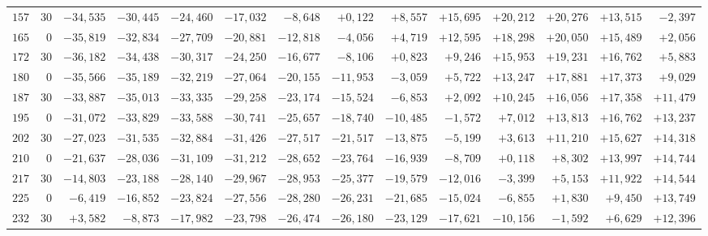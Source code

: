 \begin{landscape}
\begin{longtable}{@{}rr|r|r|r|r|r|r|r|r|r|r|r|r@{}}
\(157\) & \(30\) & \(-34{,}535\) & \(-30{,}445\) & \(-24{,}460\) & \(-17{,}032\) & \(-8{,}648\) & \(+0{,}122\) & \(+8{,}557\) & \(+15{,}695\) & \(+20{,}212\) & \(+20{,}276\) & \(+13{,}515\) & \(-2{,}397\)\\
\(165\) & \(0\) & \(-35{,}819\) & \(-32{,}834\) & \(-27{,}709\) & \(-20{,}881\) & \(-12{,}818\) & \(-4{,}056\) & \(+4{,}719\) & \(+12{,}595\) & \(+18{,}298\) & \(+20{,}050\) & \(+15{,}489\) & \(+2{,}056\)\\
\(172\) & \(30\) & \(-36{,}182\) & \(-34{,}438\) & \(-30{,}317\) & \(-24{,}250\) & \(-16{,}677\) & \(-8{,}106\) & \(+0{,}823\) & \(+9{,}246\) & \(+15{,}953\) & \(+19{,}231\) & \(+16{,}762\) & \(+5{,}883\)\\[2pt]
\(180\) & \(0\) & \(-35{,}566\) & \(-35{,}189\) & \(-32{,}219\) & \(-27{,}064\) & \(-20{,}155\) & \(-11{,}953\) & \(-3{,}059\) & \(+5{,}722\) & \(+13{,}247\) & \(+17{,}881\) & \(+17{,}373\) & \(+9{,}029\)\\
\(187\) & \(30\) & \(-33{,}887\) & \(-35{,}013\) & \(-33{,}335\) & \(-29{,}258\) & \(-23{,}174\) & \(-15{,}524\) & \(-6{,}853\) & \(+2{,}092\) & \(+10{,}245\) & \(+16{,}056\) & \(+17{,}358\) & \(+11{,}479\)\\
\(195\) & \(0\) & \(-31{,}072\) & \(-33{,}829\) & \(-33{,}588\) & \(-30{,}741\) & \(-25{,}657\) & \(-18{,}740\) & \(-10{,}485\) & \(-1{,}572\) & \(+7{,}012\) & \(+13{,}813\) & \(+16{,}762\) & \(+13{,}237\)\\
\(202\) & \(30\) & \(-27{,}023\) & \(-31{,}535\) & \(-32{,}884\) & \(-31{,}426\) & \(-27{,}517\) & \(-21{,}517\) & \(-13{,}875\) & \(-5{,}199\) & \(+3{,}613\) & \(+11{,}210\) & \(+15{,}627\) & \(+14{,}318\)\\[2pt]
\(210\) & \(0\) & \(-21{,}637\) & \(-28{,}036\) & \(-31{,}109\) & \(-31{,}212\) & \(-28{,}652\) & \(-23{,}764\) & \(-16{,}939\) & \(-8{,}709\) & \(+0{,}118\) & \(+8{,}302\) & \(+13{,}997\) & \(+14{,}744\)\\
\(217\) & \(30\) & \(-14{,}803\) & \(-23{,}188\) & \(-28{,}140\) & \(-29{,}967\) & \(-28{,}953\) & \(-25{,}377\) & \(-19{,}579\) & \(-12{,}016\) & \(-3{,}399\) & \(+5{,}153\) & \(+11{,}922\) & \(+14{,}544\)\\
\(225\) & \(0\) & \(-6{,}419\) & \(-16{,}852\) & \(-23{,}824\) & \(-27{,}556\) & \(-28{,}280\) & \(-26{,}231\) & \(-21{,}685\) & \(-15{,}024\) & \(-6{,}855\) & \(+1{,}830\) & \(+9{,}450\) & \(+13{,}749\)\\
\(232\) & \(30\) & \(+3{,}582\) & \(-8{,}873\) & \(-17{,}982\) & \(-23{,}798\) & \(-26{,}474\) & \(-26{,}180\) & \(-23{,}129\) & \(-17{,}621\) & \(-10{,}156\) & \(-1{,}592\) & \(+6{,}629\) & \(+12{,}396\)\\[2pt]

\end{longtable}
\end{landscape}
